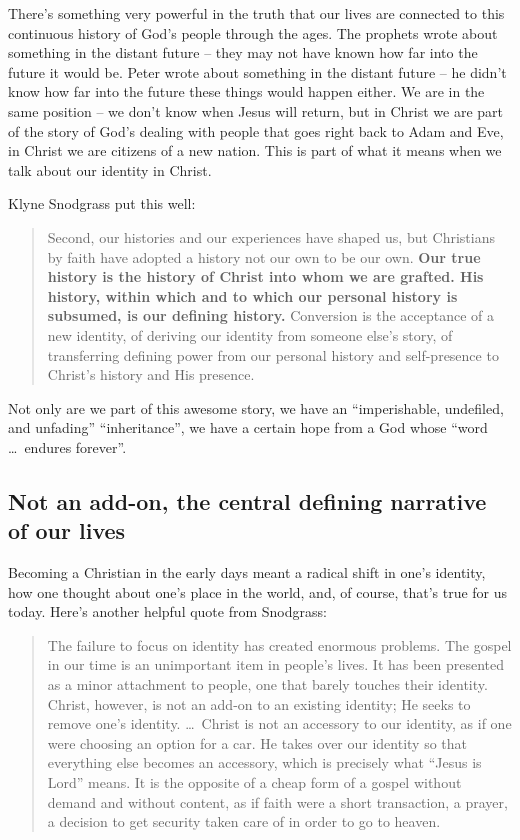 There's something very powerful in the truth that our lives are connected to
this continuous history of God's people through the ages. The prophets wrote
about something in the distant future -- they may not have known how far into
the future it would be. Peter wrote about something in the distant future -- he
didn't know how far into the future these things would happen either. We are in
the same position -- we don't know when Jesus will return, but in Christ we are
part of the story of God's dealing with people that goes right back to Adam and
Eve, in Christ we are citizens of a new nation. This is part of what it means
when we talk about our identity in Christ.

Klyne Snodgrass put this well:

\begin{quote}
    Second, our histories and our experiences have shaped us, but Christians by
    faith have adopted a history not our own to be our own. \textbf{Our true
    history is the history of Christ into whom we are grafted. His history,
    within which and to which our personal history is subsumed, is our defining
    history.} Conversion is the acceptance of a new identity, of deriving our
    identity from someone else's story, of transferring defining power from our
    personal history and self-presence to Christ's history and His presence.
    \autocite[14]{snodgrass:2011}
\end{quote}

Not only are we part of this awesome story, we have an \enquote{imperishable,
undefiled, and unfading} \enquote{inheritance}, we have a certain hope from a
God whose \enquote{word \dots\ endures forever}.

\subsection{Not an add-on, the central defining narrative of our lives}

Becoming a Christian in the early days meant a radical shift in one's identity,
how one thought about one's place in the world, and, of course, that's true for
us today. Here's another helpful quote from Snodgrass:

\begin{quote}
    The failure to focus on identity has created enormous problems. The gospel
    in our time is an unimportant item in people's lives. It has been presented
    as a minor attachment to people, one that barely touches their identity.
    Christ, however, is not an add-on to an existing identity; He seeks to
    remove one's identity. \dots\ Christ is not an accessory to our identity, as
    if one were choosing an option for a car. He takes over our identity so that
    everything else becomes an accessory, which is precisely what \enquote{Jesus
    is Lord} means. It is the opposite of a cheap form of a gospel without
    demand and without content, as if faith were a short transaction, a prayer,
    a decision to get security taken care of in order to go to heaven.
    \autocite[8]{snodgrass:2011}
\end{quote}

